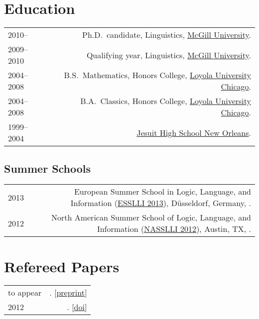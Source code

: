 \documentclass[letterpaper]{article}
\makeatletter
\newcommand{\formatdatenoday}[2]{\mydatenoday\formatdate{0}{#1}{#2}}
\newcommand{\myvrule}{\color{lightgray}\vrule width 1.0pt}
\newenvironment{cvsection}{%
  \vspace{-3ex}
  \renewcommand{\arraystretch}{1.5}
  \begin{longtable}{@{} L R @{}}
}{%
  \end{longtable}
  \vspace{1ex}
  \renewcommand{\arraystretch}{1.0}
}
\makeatother
\begin{document}

\section*{Education}

\begin{cvsection}
  2010-- & Ph.D.~candidate, Linguistics, \href{http://www.mcgill.ca/}{McGill
  University}. \\

  2009--2010 & Qualifying year, Linguistics,
  \href{http://www.mcgill.ca/}{McGill University}. \\

  2004--2008 & B.S.~Mathematics, Honors College,
  \href{http://www.luc.edu/}{Loyola University Chicago}. \\

  2004--2008 & B.A.~Classics, Honors College, \href{http://www.luc.edu/}{Loyola
  University Chicago}. \\

  1999--2004 & \href{http://www.jesuitnola.org/about/aboutindex.htm}{Jesuit
  High School New Orleans}.
\end{cvsection}

\subsection*{Summer Schools}

\begin{cvsection}
  2013 & European Summer School in Logic, Language, and Information
  (\href{http://esslli2013.de/}{ESSLLI 2013}), D\"{u}sseldorf, Germany,
  \formatdatenoday{8}{2013}. \\

  2012 & North American Summer School of Logic, Language, and Information
  (\href{http://nasslli2012.com/}{NASSLLI 2012}), Austin, TX,
  \formatdatenoday{6}{2012}.
\end{cvsection}



\section*{Refereed Papers}

\begin{cvsection}
  {\small to appear} & \hspace{0pt}.
  [\href{http://people.linguistics.mcgill.ca/~brian.buccola/files/buccola-fg2013.pdf}{preprint}]
  \\
  2012 & \hspace{0pt}.
  [\href{http://dx.doi.org/10.3765/sp}{doi}]
\end{cvsection}
\end{document}
